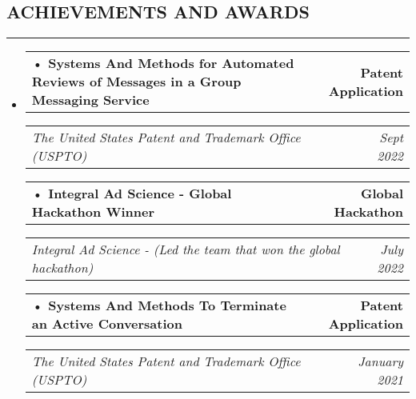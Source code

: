 \documentclass[a4paper]{article}
\makeatletter
\newcommand{\headerrow}[2]
{\begin{tabular*}{\linewidth}{l@{\extracolsep{\fill}}r}
#1 &
#2 \\
\end{tabular*}}
\makeatother
\begin{document}
\subsection*{\large ACHIEVEMENTS AND AWARDS}
\hrule
\vspace{1em}

\begin{itemize}[leftmargin=1em]
	\parskip=0.2em
			
	\item
	       \headerrow
	      {\textbf{• Systems And Methods for Automated Reviews of Messages in a Group Messaging Service}}
	      {\textbf{Patent Application}}
	      \headerrow
	      {\emph{The United States Patent and Trademark Office (USPTO)}}
	      {\emph{Sept 2022}}
	   
	       \headerrow
	      {\textbf{• Integral Ad Science - Global Hackathon Winner}}
	      {\textbf{ Global Hackathon}}
	      \headerrow
	      {\emph{Integral Ad Science - (Led the team that won the global hackathon)}}
	      {\emph{July 2022}}
	      
	      \headerrow
	      {\textbf{• Systems And Methods To Terminate an Active
Conversation}}
	      {\textbf{Patent Application}}
	      \headerrow
	      {\emph{The United States Patent and Trademark Office (USPTO)}}
	      {\emph{January 2021}}

	      
	      	      	      
\end{itemize}
\end{document}

